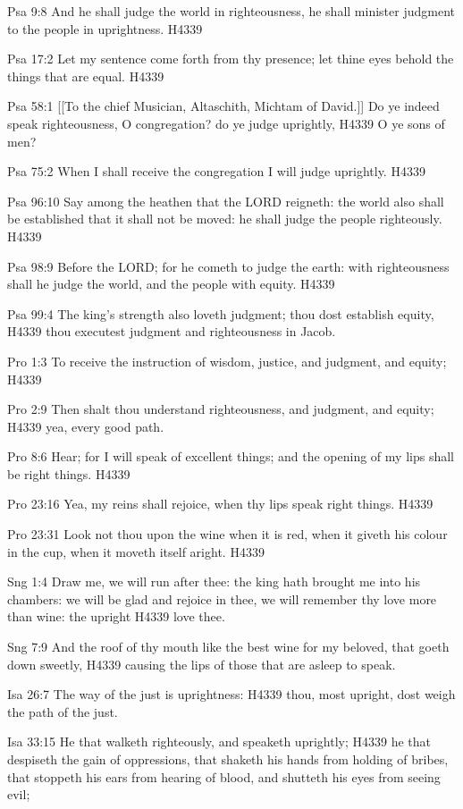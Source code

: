 \documentclass[11pt]{article}
\begin{document}
\begin{thebibliography}{37}
Psa 9:8
And he shall judge the world in righteousness, he shall minister judgment to the people in uprightness. H4339

Psa 17:2
Let my sentence come forth from thy presence; let thine eyes behold the things that are equal. H4339

Psa 58:1
[[To the chief Musician, Altaschith, Michtam of David.]] Do ye indeed speak righteousness, O congregation? do ye judge uprightly, H4339 O ye sons of men?

Psa 75:2
When I shall receive the congregation I will judge uprightly. H4339

Psa 96:10
Say among the heathen that the LORD reigneth: the world also shall be established that it shall not be moved: he shall judge the people righteously. H4339

Psa 98:9
Before the LORD; for he cometh to judge the earth: with righteousness shall he judge the world, and the people with equity. H4339

Psa 99:4
The king's strength also loveth judgment; thou dost establish equity, H4339 thou executest judgment and righteousness in Jacob.

Pro 1:3
To receive the instruction of wisdom, justice, and judgment, and equity; H4339

Pro 2:9
Then shalt thou understand righteousness, and judgment, and equity; H4339 yea, every good path.

Pro 8:6
Hear; for I will speak of excellent things; and the opening of my lips shall be right things. H4339

Pro 23:16
Yea, my reins shall rejoice, when thy lips speak right things. H4339

Pro 23:31
Look not thou upon the wine when it is red, when it giveth his colour in the cup, when it moveth itself aright. H4339

Sng 1:4
Draw me, we will run after thee: the king hath brought me into his chambers: we will be glad and rejoice in thee, we will remember thy love more than wine: the upright H4339 love thee.

Sng 7:9
And the roof of thy mouth like the best wine for my beloved, that goeth down sweetly, H4339 causing the lips of those that are asleep to speak.

Isa 26:7
The way of the just is uprightness: H4339 thou, most upright, dost weigh the path of the just.

Isa 33:15
He that walketh righteously, and speaketh uprightly; H4339 he that despiseth the gain of oppressions, that shaketh his hands from holding of bribes, that stoppeth his ears from hearing of blood, and shutteth his eyes from seeing evil;


\end{thebibliography}
\end{document}
